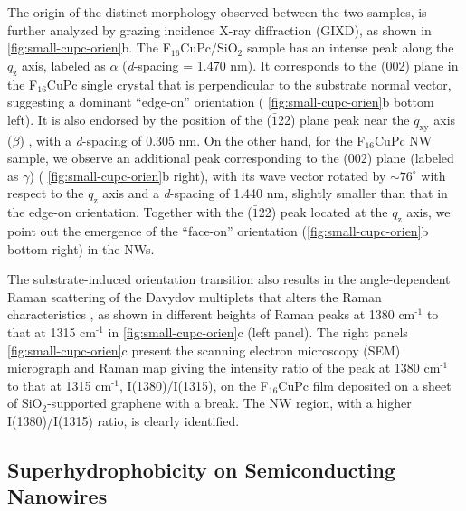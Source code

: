 The origin of the distinct morphology observed between the two
samples, is further analyzed by grazing incidence X-ray diffraction
(GIXD), as shown in \autoref{fig:small-cupc-orien}b.
The F\(_{\text{16}}\)CuPc/SiO\(_{\text{2}}\) sample has an intense
peak along the \(q_{\mathrm{z}}\) axis, labeled as \(\alpha\)
(\emph{d}-spacing = 1.470 nm). It corresponds to the (002) plane in
the F\(_{\text{16}}\)CuPc single crystal \autocite{Yang_2009_F16_PTCDA}
that is perpendicular to the substrate normal vector, suggesting a
dominant ``edge-on'' orientation ( \autoref{fig:small-cupc-orien}b
bottom left). It is also endorsed by the position of the
(\(\bar{1}\)22) plane peak near the \(q_{\mathrm{xy}}\) axis
(\(\beta\)) \autocite{Yoon_2010_crystal_F16cuPc}, with a \emph{d}-spacing
of 0.305 nm. On the other hand, for the F\(_{\text{16}}\)CuPc NW
sample, we observe an additional peak corresponding to the (002) plane
(labeled as \(\gamma\)) ( \autoref{fig:small-cupc-orien}b right), with
its wave vector rotated by \(\sim 76^{\circ}\) with respect to the
\(q_{\mathrm{z}}\) axis and a \emph{d}-spacing of 1.440 nm, slightly
smaller than that in the edge-on orientation. Together with the
(\(\bar{1}\)22) peak located at the \(q_{\mathrm{z}}\) axis, we point
out the emergence of the ``face-on'' orientation (\autoref{fig:small-cupc-orien}b bottom right) in the NWs.


The substrate-induced orientation transition also results in the
angle-dependent Raman scattering of the Davydov multiplets that alters
the Raman characteristics \autocite{Cerdeira_2013_RamanF16}, as shown in
different heights of Raman peaks at 1380 cm\(^{\text{-1}}\) to that at
1315 cm\(^{\text{-1}}\) in \autoref{fig:small-cupc-orien}c (left
panel).  The right panels \autoref{fig:small-cupc-orien}c present the scanning
electron microscopy (SEM) micrograph and Raman map giving the
intensity ratio of the peak at 1380 cm\(^{\text{-1}}\) to that at 1315
cm\(^{\text{-1}}\), I(1380)/I(1315), on the F\(_{\text{16}}\)CuPc film
deposited on a sheet of SiO\(_{\text{2}}\)-supported graphene with a
break. The NW region, with a higher I(1380)/I(1315) ratio, is clearly
identified.


\subsection*{Superhydrophobicity on Semiconducting Nanowires}
\label{sec:small-superhydr-nw}


